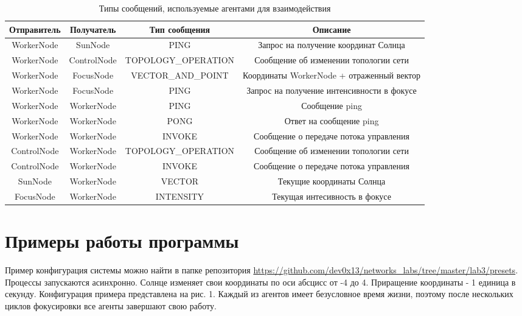\documentclass{report}
\begin{document}
\begin{table}[h]
\begin{adjustbox}{width=1.2\textwidth,center}
\begin{tabular}{ |c|c|c|c| }
 \hline
 {\bf Отправитель} & {\bf Получатель} & {\bf Тип сообщени}я & {\bf Описание} \\ [0.5ex] 
 \hline
 WorkerNode & SunNode & PING & Запрос на получение координат Солнца \\ 
 WorkerNode & ControlNode & TOPOLOGY\_OPERATION & Сообщение об изменении топологии сети \\ 
 WorkerNode & FocusNode & VECTOR\_AND\_POINT & Координаты WorkerNode + отраженный вектор \\
 WorkerNode & FocusNode & PING & Запрос на получение интенсивности в фокусе \\
 WorkerNode & WorkerNode & PING & Сообщение ping \\ 
 WorkerNode & WorkerNode & PONG & Ответ на сообщение ping \\ 
 WorkerNode & WorkerNode & INVOKE & Сообщение о передаче потока управления \\ 
 ControlNode & WorkerNode & TOPOLOGY\_OPERATION & Сообщение об изменении топологии сети \\ 
 ControlNode & WorkerNode & INVOKE & Сообщение о передаче потока управления \\ 
 SunNode & WorkerNode & VECTOR & Текущие координаты Солнца \\ 
 FocusNode & WorkerNode & INTENSITY & Текущая интесивность в фокусе \\ 
 \hline
\end{tabular}
\end{adjustbox}
\captionsetup{justification=centering}
\caption{Типы сообщений, используемые агентами для взаимодействия}
\end{table}

\newpage
\section{Примеры работы программы}
Пример конфигурация системы можно найти в папке репозитория \url{https://github.com/dev0x13/networks_labs/tree/master/lab3/presets}. Процессы запускаются асинхронно. Солнце изменяет свои координаты по оси абсцисс от -4 до 4. Приращение координаты - 1 единица в секунду. Конфигурация примера представлена на рис. 1. Каждый из агентов имеет безусловное время жизни, поэтому после нескольких циклов фокусировки все агенты завершают свою работу.
\end{document}
